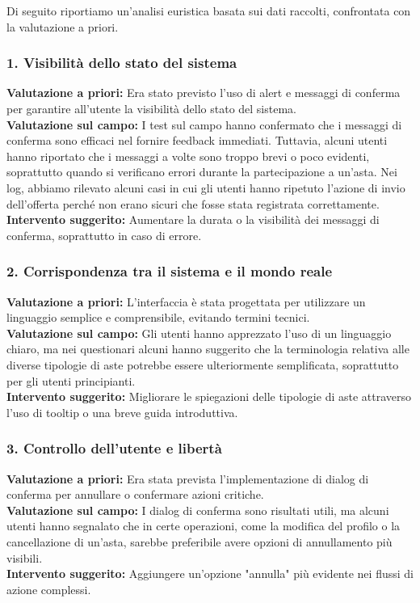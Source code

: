 Di seguito riportiamo un'analisi euristica basata sui dati raccolti, confrontata con la valutazione a priori.

\subsubsection{1. Visibilità dello stato del sistema}
\textbf{Valutazione a priori:} Era stato previsto l’uso di alert e messaggi di conferma per garantire all'utente la visibilità dello stato del sistema.\\
\textbf{Valutazione sul campo:} I test sul campo hanno confermato che i messaggi di conferma sono efficaci nel fornire feedback immediati. Tuttavia, alcuni utenti hanno riportato che i messaggi a volte sono troppo brevi o poco evidenti, soprattutto quando si verificano errori durante la partecipazione a un'asta. Nei log, abbiamo rilevato alcuni casi in cui gli utenti hanno ripetuto l'azione di invio dell'offerta perché non erano sicuri che fosse stata registrata correttamente.\\
\textbf{Intervento suggerito:} Aumentare la durata o la visibilità dei messaggi di conferma, soprattutto in caso di errore.

\subsubsection{2. Corrispondenza tra il sistema e il mondo reale}
\textbf{Valutazione a priori:} L'interfaccia è stata progettata per utilizzare un linguaggio semplice e comprensibile, evitando termini tecnici.\\
\textbf{Valutazione sul campo:} Gli utenti hanno apprezzato l'uso di un linguaggio chiaro, ma nei questionari alcuni hanno suggerito che la terminologia relativa alle diverse tipologie di aste potrebbe essere ulteriormente semplificata, soprattutto per gli utenti principianti.\\
\textbf{Intervento suggerito:} Migliorare le spiegazioni delle tipologie di aste attraverso l'uso di tooltip o una breve guida introduttiva.

\subsubsection{3. Controllo dell'utente e libertà}
\textbf{Valutazione a priori:} Era stata prevista l'implementazione di dialog di conferma per annullare o confermare azioni critiche.\\
\textbf{Valutazione sul campo:} I dialog di conferma sono risultati utili, ma alcuni utenti hanno segnalato che in certe operazioni, come la modifica del profilo o la cancellazione di un'asta, sarebbe preferibile avere opzioni di annullamento più visibili.\\
\textbf{Intervento suggerito:} Aggiungere un'opzione "annulla" più evidente nei flussi di azione complessi.

